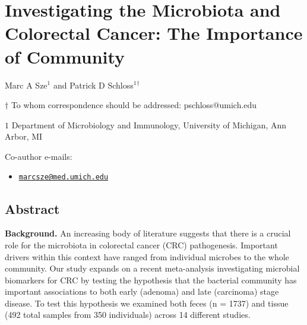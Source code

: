 \documentclass[12pt,]{article}
\title{}
\author{}
\date{}
\providecommand{\tightlist}{%
  \setlength{\itemsep}{0pt}\setlength{\parskip}{0pt}}
\begin{document}
\section{Investigating the Microbiota and Colorectal Cancer: The
Importance of
Community}\label{investigating-the-microbiota-and-colorectal-cancer-the-importance-of-community}

\begin{center}
\vspace{25mm}

Marc A Sze${^1}$ and Patrick D Schloss${^1}$${^\dagger}$

\vspace{20mm}

$\dagger$ To whom correspondence should be addressed: pschloss@umich.edu

$1$ Department of Microbiology and Immunology, University of Michigan, Ann Arbor, MI




\end{center}

Co-author e-mails:

\begin{itemize}
\tightlist
\item
  \href{mailto:marcsze@med.umich.edu}{\nolinkurl{marcsze@med.umich.edu}}
\end{itemize}

\newpage

\linenumbers

\subsection{Abstract}\label{abstract}

\textbf{Background.} An increasing body of literature suggests that
there is a crucial role for the microbiota in colorectal cancer (CRC)
pathogenesis. Important drivers within this context have ranged from
individual microbes to the whole community. Our study expands on a
recent meta-analysis investigating microbial biomarkers for CRC by
testing the hypothesis that the bacterial community has important
associations to both early (adenoma) and late (carcinoma) stage disease.
To test this hypothesis we examined both feces (n = 1737) and tissue
(492 total samples from 350 individuals) across 14 different studies.
\end{document}
